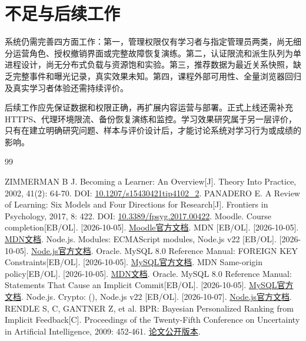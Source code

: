 \documentclass[UTF8,12pt,a4paper,oneside,openany]{ctexbook}
\begin{document}
\section{不足与后续工作}

系统仍需完善四方面工作：第一，管理权限仅有学习者与指定管理员两类，尚无细分运营角色、授权撤销界面或完整故障恢复演练。第二，认证限流和派生队列为单进程设计，尚无分布式负载与资源饱和实验。第三，推荐数据为最近关系快照，缺乏完整事件和曝光记录，真实效果未知。第四，课程外部可用性、全量浏览器回归及真实学习者体验还需持续评价。


后续工作应先保证数据和权限正确，再扩展内容运营与部署。正式上线还需补充HTTPS、代理环境限流、备份恢复演练和监控。学习效果研究属于另一层评价，只有在建立明确研究问题、样本与评价设计后，才能讨论系统对学习行为或成绩的影响。


\begin{thebibliography}{99}
 ZIMMERMAN B J. Becoming a  Learner: An Overview[J]. Theory Into Practice, 2002, 41(2): 64-70. DOI: \href{https://doi.org/10.1207/s15430421tip4102_2}{10.1207/s15430421tip4102\_2}.
 PANADERO E. A Review of  Learning: Six Models and Four Directions for Research[J]. Frontiers in Psychology, 2017, 8: 422. DOI: \href{https://doi.org/10.3389/fpsyg.2017.00422}{10.3389/fpsyg.2017.00422}.
 Moodle. Course completion[EB/OL]. [2026-10-05]. \href{https://docs.moodle.org/en/Course_completion}{Moodle官方文档}.
 MDN  [EB/OL]. [2026-10-05]. \href{https://developer.mozilla.org/en-US/docs/Web/CSS/Reference/At-rules/@media/prefers-reduced-motion}{MDN文档}.
 Node.js. Modules: ECMAScript modules, Node.js v22 [EB/OL]. [2026-10-05]. \href{https://nodejs.org/docs/latest-v22.x/api/esm.html}{Node.js官方文档}.
 Oracle. MySQL 8.0 Reference Manual: FOREIGN KEY Constraints[EB/OL]. [2026-10-05]. \href{https://dev.mysql.com/doc/refman/8.0/en/create-table-foreign-keys.html}{MySQL官方文档}.
 MDN  Same-origin policy[EB/OL]. [2026-10-05]. \href{https://developer.mozilla.org/en-US/docs/Web/Security/Defenses/Same-origin_policy}{MDN文档}.
 Oracle. MySQL 8.0 Reference Manual: Statements That Cause an Implicit Commit[EB/OL]. [2026-10-05]. \href{https://dev.mysql.com/doc/refman/8.0/en/implicit-commit.html}{MySQL官方文档}.
 Node.js. Crypto: (), Node.js v22 [EB/OL]. [2026-10-07]. \href{https://nodejs.org/docs/latest-v22.x/api/crypto.html\#cryptoscryptpassword-salt-keylen-options-callback}{Node.js官方文档}.
 RENDLE S,  C, GANTNER Z, et al. BPR: Bayesian Personalized Ranking from Implicit Feedback[C]. Proceedings of the Twenty-Fifth Conference on Uncertainty in Artificial Intelligence, 2009: 452-461. \href{https://arxiv.org/abs/1205.2618}{论文公开版本}.
\end{thebibliography}
\end{document}
